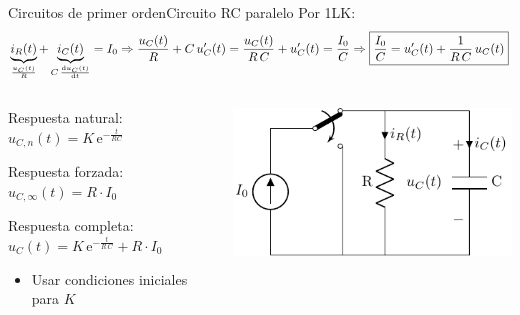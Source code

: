 \documentclass[aspectratio=169, xcolor={usenames,svgnames,dvipsnames}]{beamer}
\begin{document}
\begin{frame}{Circuitos de primer orden}{Circuito RC paralelo}
Por 1LK:
\begin{align*}
  \underbrace{i_R(t)}_{\frac{u_C(t)}{R}} + \underbrace{i_C(t)}_{C\,\diff{u_C(t)}{t}} = I_0 \Rightarrow \dfrac{u_C(t)}{R}+C\, u_C'(t)=\dfrac{u_C(t)}{R\,C}+u_C'(t)=\dfrac{I_0}{C}\Rightarrow  \boxed{\dfrac{I_0}{C}=u_C'(t)+\dfrac{1}{R\, C}\,u_C(t)}
\end{align*}
\begin{columns}
\begin{column}{0.6\linewidth}
Respuesta natural: $u_{C,n}(t) = K\,\mathrm{e}^{-\frac{t}{RC}}$

Respuesta forzada: $  u_{C,\infty}(t) = R\cdot I_0$

Respuesta completa:  $u_C(t)=K\,\mathrm{e}^{-\frac{t}{R\,C}}+R\cdot I_0$ 
\begin{itemize}
    \item Usar condiciones iniciales para $K$
\end{itemize}
\end{column}
\begin{column}{0.4\linewidth}
\begin{center}
\includegraphics[width=\linewidth]{../figs/transitorio_circuitoRC.pdf}
\end{center}
\end{column}
\end{columns}
\end{frame}
\end{document}
